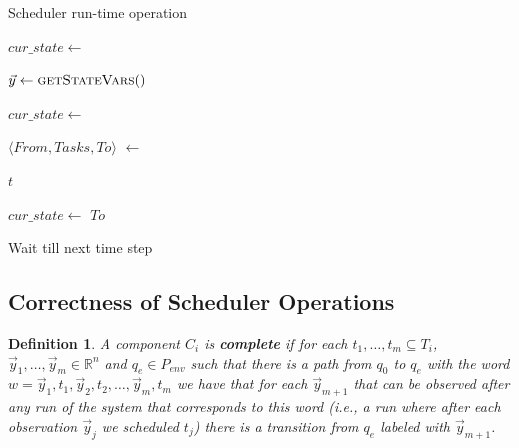 \documentclass[ twoside, 12pt ]{article}
\newcommand\R{{\mathbb R}}
\newtheorem{dfn}{Definition} %
\begin{document}
\begin{algorithm}[h]
    \caption{Scheduler run-time operation}
    \begin{algorithmic}[1]
         
            \State $cur\_state \gets$  
            
            \Statex
            \Loop 
                \State $\vec{y} \gets \Call{getStateVars}$  
                
                \State $cur\_state \gets$  
                
                \State $\langle From , Tasks, To \rangle$  $\gets$  
                
                 
                    \State {} {$t$}
                \EndFor
                
                \State $cur\_state \gets$ $To$ 
                
                \State Wait till next time step
                
            \EndLoop
        \EndProcedure
    \end{algorithmic}
    \label{code:scheduler}
\end{algorithm}


\subsection{Correctness of Scheduler Operations}

\begin{dfn}
    A component $C_i$ is \textbf{complete} if for each $t_1, \dots, t_m \subseteq T_i$, $\vec{y}_1, \dots , \vec{y}_m \in \R^n$ and $q_e \in P_{env}$ such that there is a path from $q_0$ to $q_e$ with the word $w= \vec{y}_1 , t_1 , \vec{y}_2 , t_2, \dots , \vec{y}_{m}, t_m$ we have that for each $\vec{y}_{m+1}$ that can be observed after any run of the system that corresponds to this word (i.e., a run where after each observation $\vec{y}_j$ we scheduled $t_j$) there is a transition from $q_e$ labeled with $\vec{y}_{m+1}$.
\end{dfn}
\end{document}
